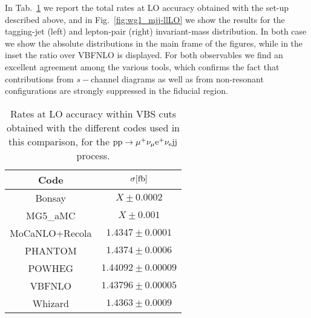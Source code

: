  In Tab.~\ref{tab:wg1_LOrates} we report the total rates at LO accuracy obtained with the set-up described above, and in Fig.~\ref{fig:wg1_mjj-llLO} we show the results
for the tagging-jet (left) and lepton-pair (right) invariant-mass distribution. In both case we show the absolute distributions in the main frame of the 
figures, while in the inset the ratio over {\sc VBFNLO} is displayed. For both observables we find 
an excellent agreement among the various tools, which confirms the fact
that contributions from $s-$channel diagrams as well as from non-resonant configurations are strongly suppressed in the fiducial region.
\begin{table}[h!]
    \centering
    \begin{tabular}{c|c}
        Code  &  $\sigma[\rm{fb}]$  \\
        \hline
        \hline
        {\sc Bonsay}  &  $X \pm 0.0002$ \\
        {\sc MG5\_aMC}&  $X \pm 0.001$  \\ 
        {\sc MoCaNLO+Recola}  &  $1.4347 \pm 0.0001$ \\
        {\sc PHANTOM}&  $1.4374 \pm 0.0006 $  \\
        {\sc POWHEG}  &  $1.44092 \pm 0.00009$ \\
        {\sc VBFNLO}  &  $1.43796 \pm 0.00005$ \\
        {\sc Whizard}&  $1.4363 \pm 0.0009 $
    \end{tabular}
    \caption{\label{tab:wg1_LOrates} Rates at LO accuracy within VBS cuts obtained with the different codes used in this comparison, 
    for the ${\rm p}{\rm p}\to\mu^+\nu_\mu{\rm e}^+\nu_{\rm e}{\rm j}{\rm j}$ process.}
\end{table}

